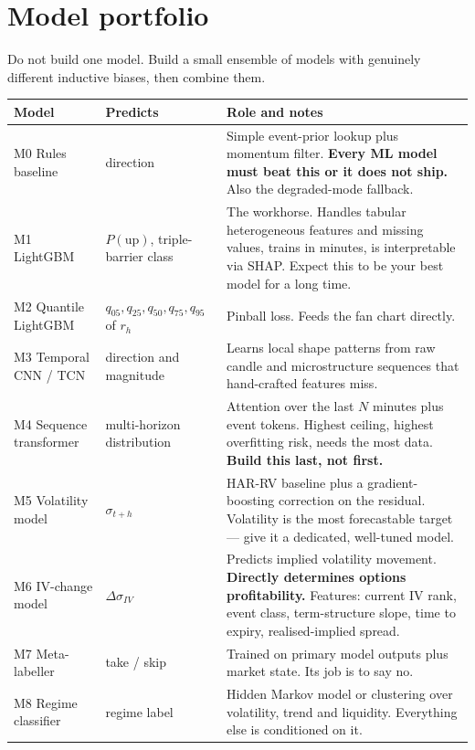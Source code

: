 \section{Model portfolio}

Do not build one model. Build a small ensemble of models with genuinely
different inductive biases, then combine them.

\begin{longtable}{@{}p{3.2cm}p{3.4cm}p{7.8cm}@{}}
\toprule
\textbf{Model} & \textbf{Predicts} & \textbf{Role and notes}\\
\midrule
M0 Rules baseline & direction & Simple event-prior lookup plus momentum filter.
\textbf{Every ML model must beat this or it does not ship.} Also the
degraded-mode fallback.\\
M1 LightGBM & $P(\text{up})$, triple-barrier class & The workhorse. Handles
tabular heterogeneous features and missing values, trains in minutes, is
interpretable via SHAP. Expect this to be your best model for a long time.\\
M2 Quantile LightGBM & $q_{05},q_{25},q_{50},q_{75},q_{95}$ of $r_h$ &
Pinball loss. Feeds the fan chart directly.\\
M3 Temporal CNN / TCN & direction and magnitude & Learns local shape patterns
from raw candle and microstructure sequences that hand-crafted features miss.\\
M4 Sequence transformer & multi-horizon distribution & Attention over the last
$N$ minutes plus event tokens. Highest ceiling, highest overfitting risk, needs
the most data. \textbf{Build this last, not first.}\\
M5 Volatility model & $\sigma_{t+h}$ & HAR-RV baseline plus a gradient-boosting
correction on the residual. Volatility is the most forecastable target ---
give it a dedicated, well-tuned model.\\
M6 IV-change model & $\Delta\sigma_{IV}$ & Predicts implied volatility movement.
\textbf{Directly determines options profitability.} Features: current IV rank,
event class, term-structure slope, time to expiry, realised-implied spread.\\
M7 Meta-labeller & take / skip & Trained on primary model outputs plus market
state. Its job is to say no.\\
M8 Regime classifier & regime label & Hidden Markov model or clustering over
volatility, trend and liquidity. Everything else is conditioned on it.\\
\bottomrule
\end{longtable}

